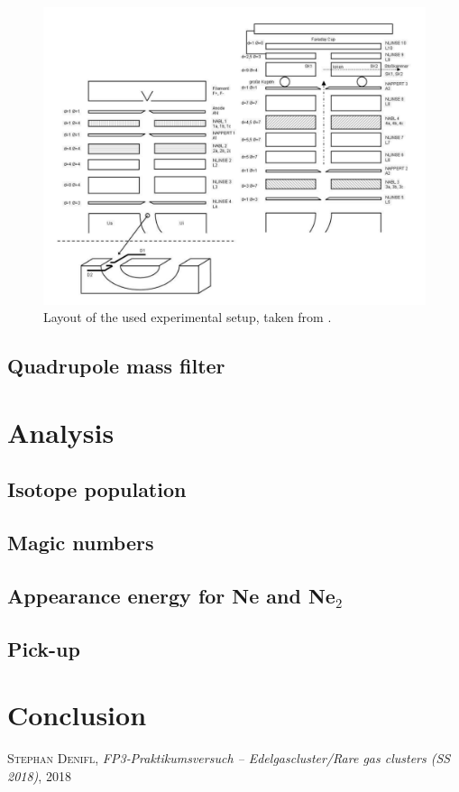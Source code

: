 \documentclass[a4paper,10pt]{article}
\begin{document}
\begin{figure}[htp!]
	\centering
	\includegraphics[width = 1 \textwidth]{setup.png}
	\caption{Layout of the used experimental setup, taken from \cite{script}. }
	\label{setup}
\end{figure}

\subsection{Quadrupole mass filter}

\section{Analysis}
\subsection{Isotope population}
\subsection{Magic numbers}
\subsection{Appearance energy for Ne and Ne$_2$}
\subsection{Pick-up}
\section{Conclusion}

\begin{thebibliography}{99}
\textsc{Stephan Denifl}, \textit{FP3‐Praktikumsversuch – Edelgascluster/Rare gas clusters (SS 2018)}, 2018


\end{thebibliography}
\end{document}
